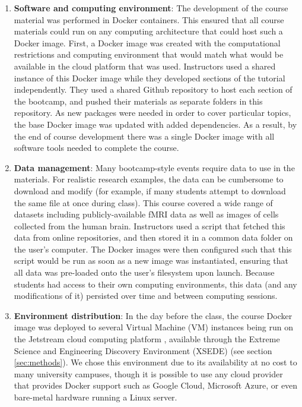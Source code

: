 \begin{enumerate}

\item {\bf Software and computing environment}: The development of the course material was
performed in Docker containers. This ensured that all course materials could
run on any computing architecture that could host such a Docker image.
First, a Docker image
\cite{merkel2014docker} was created with the computational restrictions and
computing environment that would match what would be available in the cloud
platform that was used. Instructors used a shared instance of this Docker
image while they developed sections of the tutorial independently. They used a
shared Github repository to host each section of the bootcamp, and pushed their
materials as separate folders in this repository. As new packages were needed in
order to cover particular topics, the base Docker image was updated with added
dependencies. As a result, by the end of course development there was a single
Docker image with all software tools needed to complete the course.

\item {\bf Data management}: Many bootcamp-style events require data to use in
the materials. For realistic research examples, the data can be cumbersome to
download and modify (for example, if many students attempt to download the
same file at once during class). This course covered a wide range of datasets
including publicly-available fMRI data
as well as images of cells collected from the human brain. Instructors used a
script that fetched this data from online repositories, and then stored it in
a common data folder on the user's computer. The Docker images were then
configured such that this script would be run as soon as a new image was
instantiated, ensuring that all data was pre-loaded onto the user's
filesystem upon launch. Because students had access to their
own computing environments, this data (and any modifications of it) persisted
over time and between computing sessions.

\item {\bf Environment distribution}: In the
day before the class, the course Docker image was deployed to several Virtual Machine (VM)
instances being run on the Jetstream cloud computing platform
\cite{Stewart2015Jetstream}, available through the Extreme Science and
Engineering Discovery Environment (XSEDE) \cite{Towns2014XSEDE}  (see section
\ref{sec:methods}). We chose this environment due to its availability at no cost to many
university campuses, though it is possible to use any cloud provider that
provides Docker support such as Google Cloud, Microsoft Azure, or even
bare-metal hardware running a Linux server.


\end{enumerate}
